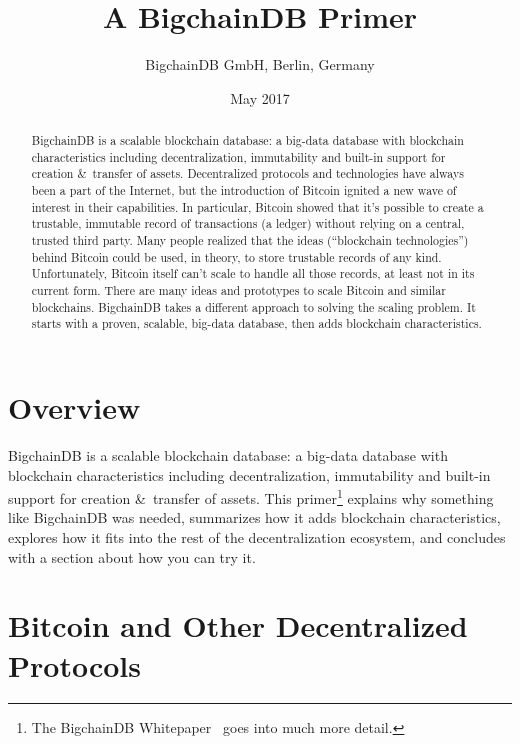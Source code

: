 \documentclass[a4paper]{article}
\title{A BigchainDB Primer}
\author{BigchainDB GmbH, Berlin, Germany}
\date{May 2017}
\begin{document}
\maketitle

\begin{abstract}
BigchainDB is a scalable blockchain database:
a big-data database with blockchain characteristics
including decentralization, immutability and
built-in support for creation \&~transfer of assets.
Decentralized protocols and technologies have always been a part of the Internet,
but the introduction of Bitcoin ignited a new wave of interest in their capabilities.
In particular, Bitcoin showed that it's possible to create a trustable, immutable
record of transactions (a ledger) without relying on a central, trusted third party.
Many people realized that the ideas (``blockchain technologies'') behind Bitcoin
could be used, in theory, to store trustable records of any kind.
Unfortunately, Bitcoin itself can't scale to handle all those records,
at least not in its current form.
There are many ideas and prototypes to scale Bitcoin and similar blockchains.
BigchainDB takes a different approach to solving the scaling problem.
It starts with a proven, scalable, big-data database,
then adds blockchain characteristics.
\end{abstract}


\section{Overview}

BigchainDB is a scalable blockchain database:
a big-data database with blockchain characteristics
including decentralization, immutability and
built-in support for creation \&~transfer of assets.
This primer\footnote{The
BigchainDB Whitepaper~\cite{bigchaindb_whitepaper}
goes into much more detail.}
explains why something like BigchainDB was needed,
summarizes how it adds blockchain characteristics,
explores how it fits into the rest of the decentralization ecosystem,
and concludes with a section about how you can try it.


\section{Bitcoin and Other Decentralized Protocols}
\end{document}
